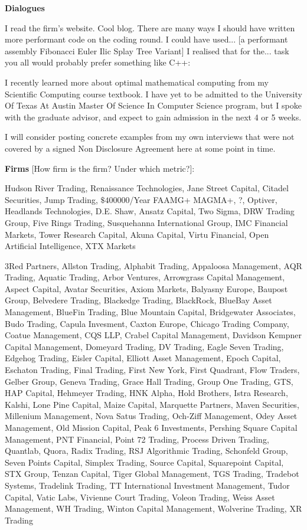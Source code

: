 \newpage

\textbf{Dialogues}

I read the firm's website. Cool blog. There are many ways I should have written more performant code on the coding round. I could have used... [a performant assembly Fibonacci Euler Ilic Splay Tree Variant] I realised that for the... task you all would probably prefer something like C++:

I recently learned more about optimal mathematical computing from my Scientific Computing course textbook. I have yet to be admitted to the University Of Texas At Austin Master Of Science In Computer Science program, but I spoke with the graduate advisor, and expect to gain admission in the next 4 or 5 weeks.

I will consider posting concrete examples from my own interviews that were not covered by a signed Non Disclosure Agreement here at some point in time.

\newpage

\textbf{Firms} [How firm is the firm? Under which metric?]:

Hudson River Trading, Renaissance Technologies, Jane Street Capital, Citadel Securities, Jump Trading, $\$ 400000$/Year FAAMG+ MAGMA+, ?, Optiver, Headlands Technologies, D.E. Shaw, Ansatz Capital, Two Sigma, DRW Trading Group, Five Rings Trading, Susquehanna International Group, IMC Financial Markets, Tower Research Capital, Akuna Capital, Virtu Financial, Open Artificial Intelligence, XTX Markets

3Red Partners, Allston Trading, Alphabit Trading, Appaloosa Management, AQR Trading, Aquatic Trading, Arbor Ventures, Arrowgrass Capital Management, Aspect Capital, Avatar Securities, Axiom Markets, Balyasny Europe, Baupost Group, Belvedere Trading, Blackedge Trading, BlackRock, BlueBay Asset Management, BlueFin Trading, Blue Mountain Capital, Bridgewater Associates, Budo Trading, Capula Invesment, Caxton Europe, Chicago Trading Company, Coatue Management, CQS LLP, Crabel Capital Management, Davidson Kempner Capital Management, Domeyard Trading, DV Trading, Eagle Seven Trading, Edgehog Trading, Eisler Capital, Elliott Asset Management, Epoch Capital, Eschaton Trading, Final Trading, First New York, First Quadrant, Flow Traders, Gelber Group, Geneva Trading, Grace Hall Trading, Group One Trading, GTS, HAP Capital, Hehmeyer Trading, HNK Alpha, Hold Brothers, Istra Research, Kalshi, Lone Pine Capital, Maize Capital, Marquette Partners, Maven Securities, Millenium Management, Nova Satus Trading, Och-Ziff Management, Odey Asset Management, Old Mission Capital, Peak 6 Investments, Pershing Square Capital Management, PNT Financial, Point 72 Trading, Process Driven Trading, Quantlab, Quora, Radix Trading, RSJ Algorithmic Trading, Schonfeld Group, Seven Points Capital, Simplex Trading, Source Capital, Squarepoint Capital, STX Group, Tenzan Capital, Tiger Global Management, TGS Trading, Tradebot Systems, Tradelink Trading, TT International Investment Management, Tudor Capital, Vatic Labs, Vivienne Court Trading, Voleon Trading, Weiss Asset Management, WH Trading, Winton Capital Management, Wolverine Trading, XR Trading

